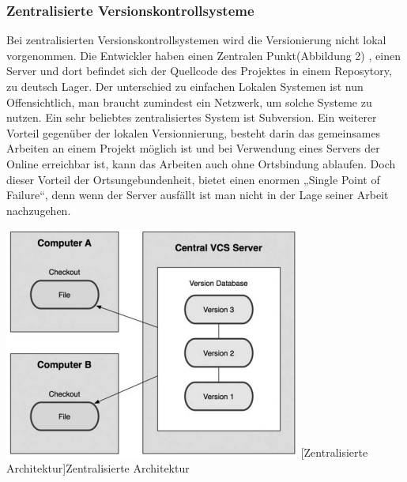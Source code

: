 \documentclass[12pt,a4paper,bibliography=totocnumbered,listof=totocnumbered]{scrartcl}
\begin{document}
\subsubsection{Zentralisierte Versionskontrollsysteme}
Bei zentralisierten Versionskontrollsystemen wird die Versionierung nicht lokal vorgenommen. Die Entwickler haben einen Zentralen Punkt(Abbildung 2) , einen Server und dort befindet sich der Quellcode des Projektes in einem Reposytory, zu deutsch Lager. Der unterschied zu einfachen Lokalen Systemen ist nun Offensichtlich, man braucht zumindest ein Netzwerk, um solche Systeme zu nutzen. Ein sehr beliebtes zentralisiertes System ist Subversion. Ein weiterer Vorteil gegenüber der lokalen Versionnierung, besteht darin das gemeinsames Arbeiten an einem Projekt möglich ist und bei Verwendung eines Servers der Online erreichbar ist, kann das Arbeiten auch ohne Ortsbindung ablaufen. Doch dieser Vorteil der Ortsungebundenheit, bietet einen enormen „Single Point of Failure“, denn wenn der Server ausfällt ist man nicht in der Lage seiner Arbeit nachzugehen.

\vspace{3pt}
\begin{minipage}{\linewidth}
	\centering
	\includegraphics[width=0.3\linewidth]{Bilder/sub.png}
	[Zentralisierte Architektur]{Zentralisierte Architektur\footnotemark }
	\label{fig:osgi}
\end{minipage} 	
\end{document}
